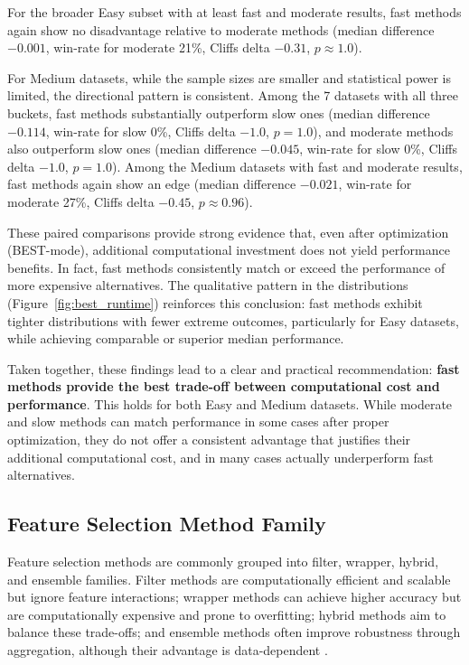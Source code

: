 \documentclass[preprint,12pt,authoryear]{elsarticle}
\begin{document}
{For the broader Easy subset with at least fast and moderate results, fast methods again show no disadvantage relative to moderate methods (median difference $-0.001$, win-rate for moderate 21\%, Cliffs delta $-0.31$, $p \approx 1.0$).

For Medium datasets, while the sample sizes are smaller and statistical power is limited, the directional pattern is consistent. Among the 7 datasets with all three buckets, fast methods substantially outperform slow ones (median difference $-0.114$, win-rate for slow 0\%, Cliffs delta $-1.0$, $p = 1.0$), and moderate methods also outperform slow ones (median difference $-0.045$, win-rate for slow 0\%, Cliffs delta $-1.0$, $p = 1.0$). Among the Medium datasets with fast and moderate results, fast methods again show an edge (median difference $-0.021$, win-rate for moderate 27\%, Cliffs delta $-0.45$, $p \approx 0.96$).

These paired comparisons provide strong evidence that, even after optimization (BEST-mode), additional computational investment does not yield performance benefits. In fact, fast methods consistently match or exceed the performance of more expensive alternatives. The qualitative pattern in the distributions (Figure~\ref{fig:best_runtime}) reinforces this conclusion: fast methods exhibit tighter distributions with fewer extreme outcomes, particularly for Easy datasets, while achieving comparable or superior median performance.

Taken together, these findings lead to a clear and practical recommendation: \textbf{fast methods provide the best trade-off between computational cost and performance}. This holds for both Easy and Medium datasets. While moderate and slow methods can match performance in some cases after proper optimization, they do not offer a consistent advantage that justifies their additional computational cost, and in many cases actually underperform fast alternatives. 



\subsection{Feature Selection Method Family}\label{sec:family_results}

Feature selection methods are commonly grouped into filter, wrapper, hybrid, and ensemble families. Filter methods are computationally efficient and scalable but ignore feature interactions; wrapper methods can achieve higher accuracy but are computationally expensive and prone to overfitting; hybrid methods aim to balance these trade-offs; and ensemble methods often improve robustness through aggregation, although their advantage is data-dependent \cite{theng2025feature,pmc2024hybrid,pmc2023nes,peerj2023review}.

}
\end{document}
